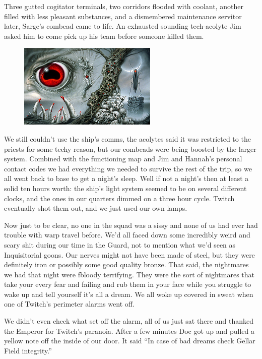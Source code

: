 Three gutted cogitator terminals, two corridors flooded with coolant, another filled with less pleasant substances, and a dismembered maintenance servitor later, Sarge’s combead came to life. 
An exhausted sounding tech-acolyte Jim asked him to come pick up his team before someone killed them.

\begin{figure}
	\begin{center}
		\includegraphics[width=\figwidth]{pics/7/14.png}
	\end{center}
\end{figure}
We still couldn’t use the ship’s comms, the acolytes said it was restricted to the priests for some techy reason, but our combeads were being boosted by the larger system. 
Combined with the functioning map and Jim and Hannah’s personal contact codes we had everything we needed to survive the rest of the trip, so we all went back to base to get a night’s sleep. 
Well if not a night’s then at least a solid ten hours worth: 
the ship’s light system seemed to be on several different clocks, and the ones in our quarters dimmed on a three hour cycle. 
Twitch eventually shot them out, and we just used our own lamps.

Now just to be clear, no one in the squad was a sissy and none of us had ever had trouble with warp travel before. 
We’d all faced down some incredibly weird and scary shit during our time in the Guard, not to mention what we’d seen as Inquisitorial goons. 
Our nerves might not have been made of steel, but they were definitely iron or possibly some good quality bronze. 
That said, the nightmares we had that night were fbloody terrifying. 
They were the sort of nightmares that take your every fear and failing and rub them in your face while you struggle to wake up and tell yourself it’s all a dream. 
We all woke up covered in sweat when one of Twitch’s perimeter alarms went off.

We didn’t even check what set off the alarm, all of us just sat there and thanked the Emperor for Twitch’s paranoia. 
After a few minutes Doc got up and pulled a yellow note off the inside of our door. 
It said “In case of bad dreams check Gellar Field integrity.”

